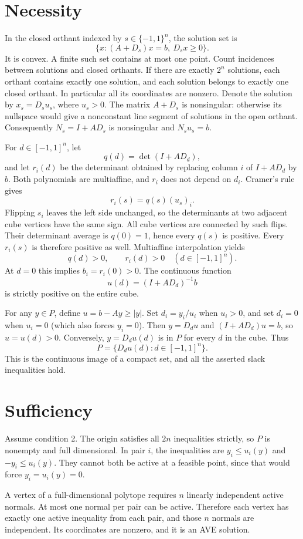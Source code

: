 \documentclass[11pt,a4paper]{article}
\theoremstyle{remark}\newtheorem{remark}[theorem]{Remark}
\begin{document}
\section{Necessity}
In the closed orthant indexed by $s\in\{-1,1\}^n$, the solution set is
\[
 \{x:(A+D_s)x=b,\ D_sx\ge0\}.
\]
It is convex. A finite such set contains at most one point. Count incidences between solutions and closed orthants. If there are exactly $2^n$ solutions, each orthant contains exactly one solution, and each solution belongs to exactly one closed orthant. In particular all its coordinates are nonzero. Denote the solution by $x_s=D_su_s$, where $u_s>0$. The matrix $A+D_s$ is nonsingular: otherwise its nullspace would give a nonconstant line segment of solutions in the open orthant. Consequently $N_s=I+AD_s$ is nonsingular and $N_su_s=b$.

For $d\in[-1,1]^n$, let
\[
 q(d)=\det(I+AD_d),
\]
and let $r_i(d)$ be the determinant obtained by replacing column $i$ of $I+AD_d$ by $b$. Both polynomials are multiaffine, and $r_i$ does not depend on $d_i$. Cramer's rule gives
\[
 r_i(s)=q(s)(u_s)_i.
\]
Flipping $s_i$ leaves the left side unchanged, so the determinants at two adjacent cube vertices have the same sign. All cube vertices are connected by such flips. Their determinant average is $q(0)=1$, hence every $q(s)$ is positive. Every $r_i(s)$ is therefore positive as well. Multiaffine interpolation yields
\[
 q(d)>0,\qquad r_i(d)>0\quad(d\in[-1,1]^n).
\]
At $d=0$ this implies $b_i=r_i(0)>0$. The continuous function
\[
 u(d)=(I+AD_d)^{-1}b
\]
is strictly positive on the entire cube.

For any $y\in P$, define $u=b-Ay\ge|y|$. Set $d_i=y_i/u_i$ when $u_i>0$, and set $d_i=0$ when $u_i=0$ (which also forces $y_i=0$). Then $y=D_du$ and $(I+AD_d)u=b$, so $u=u(d)>0$. Conversely, $y=D_du(d)$ is in $P$ for every $d$ in the cube. Thus
\[
 P=\{D_du(d):d\in[-1,1]^n\}.
\]
This is the continuous image of a compact set, and all the asserted slack inequalities hold.
\section{Sufficiency}
Assume condition 2. The origin satisfies all $2n$ inequalities strictly, so $P$ is nonempty and full dimensional. In pair $i$, the inequalities are $y_i\le u_i(y)$ and $-y_i\le u_i(y)$. They cannot both be active at a feasible point, since that would force $y_i=u_i(y)=0$.

A vertex of a full-dimensional polytope requires $n$ linearly independent active normals. At most one normal per pair can be active. Therefore each vertex has exactly one active inequality from each pair, and those $n$ normals are independent. Its coordinates are nonzero, and it is an AVE solution.
\end{document}

